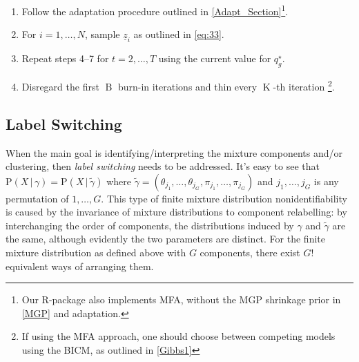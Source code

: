 \documentclass[a4paper,12pt,fleqn]{article}
\numberwithin{equation}{section}
\def\given{\,|\,}
\begin{document}
\begin{enumerate}[label*=\arabic*.]
\begin{alignat*}{4}
		\alphloop&\delta_{g1}^{\left(t\right)} &\sim& \operatorname{Ga}\left(\alpha_1 + \frac{pq_g^\star}{2}, 1 + \frac{1}{2}\sum_{h=1}^{q_g^\star}\tau_{gh}^{\left(1\right)^{\left(t-1\right)}}\sum_{j=1}^p\lambda_{gjh}^{2^{\left(t\right)}}\phi_{gjh}^{\left(t\right)}\right)\\
		&\delta_{gh}^{\left(t\right)} &\sim& \operatorname{Ga}\left(\alpha_2 + \frac{p}{2}\left(q_g^\star-k+1\right), 1 + \frac{1}{2}\sum_{h=k}^{q_g^\star}\tau_{gh}^{\left(k\right)^{\left(t\right)}}\sum_{j=1}^p\lambda_{gjh}^{2^{\left(t-1\right)}}\phi_{gjh}^{\left(t\right)}\right),\quad h\geq 2\\
		&\tau_{gk}^{\left(t\right)} &=& \prod_{h=1}^{k}\delta_{gh}^{\left(t\right)}\quad\hspace{38mm}\forall~k=1,\ldots,q_g^\star\nonumber
		\end{alignat*}
	\item Follow the adaptation procedure outlined in \ref{Adapt_Section}\footnote{Our R-package also implements MFA, without the MGP shrinkage prior in \ref{MGP} and adaptation.}.
	\item For $i=1,\ldots,N$, sample $\underline{z}_i$ as outlined in \eqref{eq:33}.
	\item Repeat steps 4--7 for $t=2,\ldots,T$ using the current value for $q_g^\star$.
	\item Disregard the first $\operatorname{B}$ burn-in iterations and thin every $\operatorname{K}$-th iteration \footnote{If using the MFA approach, one should choose between competing models using the BICM, as outlined in \ref{Gibbs1}}.
\end{enumerate}
\subsection[Label Switching]{Label Switching}
When the main goal is identifying/interpreting the mixture components and/or clustering, then \textit{label switching} needs to be addressed. It's easy to see that $\mathrm{P}\left(X\given\gamma\right) = \mathrm{P}\left(X\given\tilde\gamma\right)$ where $\tilde\gamma = \left(\theta_{j_1},\ldots,\theta_{j_G},\pi_{j_1},\ldots,\pi_{j_G}\right)$ and $j_1,\ldots,j_G$ is any permutation of $1,\ldots,G$. This type of finite mixture distribution nonidentifiability is caused by the invariance of mixture distributions to component relabelling: by interchanging the order of components, the distributions induced by $\gamma$ and $\tilde{\gamma}$ are the same, although evidently the two parameters are distinct. For the finite mixture distribution as defined above with $G$ components, there exist $G!$ equivalent ways of arranging them.

\end{document}
